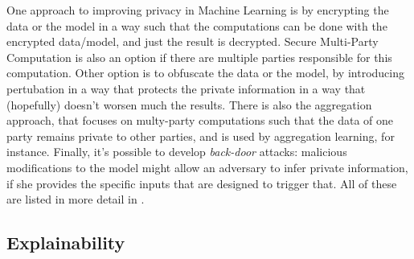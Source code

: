 One approach to improving privacy in Machine Learning is by encrypting the data or the model in a way such that the computations can be done with the encrypted data/model, and just the result is decrypted. Secure Multi-Party Computation is also an option if there are multiple parties responsible for this computation. Other option is to obfuscate the data or the model, by introducing pertubation in a way that protects the private information in a way that (hopefully) doesn't worsen much the results. There is also the aggregation approach, that focuses on multy-party computations such that the data of one party remains private to other parties, and is used by aggregation learning, for instance. Finally, it's possible to develop \textit{back-door} attacks: malicious modifications to the model might allow an adversary to infer private information, if she provides the specific inputs that are designed to trigger that. All of these are listed in more detail in \cite{WMLMPASAO}.


\subsection{Explainability}




